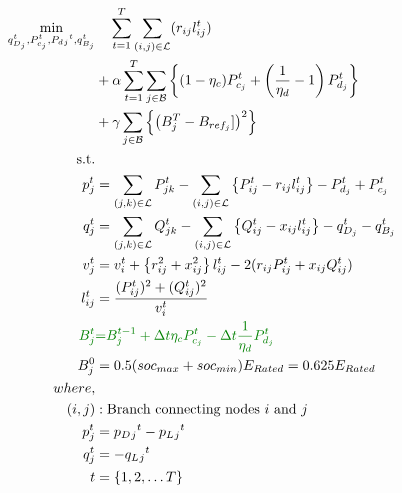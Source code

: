 \begin{gather}
	\begin{align}
		\min_{
		\substack{
		q_{D_j}^t, P_{c_j}^t, P_d{_j}^t, q_{B_j}^t}
		} 
		\vspace{-15ex} %
		& \quad
		\sum_{t = 1}^{T} \sum_{(i, j) \in \mathcal{L}} (r_{ij}l_{ij}^t) \\
		&+ \alpha \sum_{t = 1}^{T} \sum_{j \in \mathcal{B}} \left\{ (1- \eta_c)P_{c_j}^t + \left(\frac{1}{\eta_d}-1\right) P_{d_j}^t \right\} \\
		&+ \gamma \sum_{j \in \mathcal{B}} \left\{ \left(B^{T}_{j} - B_{ref_{j}}]\right)^2\right\} \\
		\text{s.t.} & {}\nonumber \\
		{p_j^t} & = {\sum_{(j, k) \in \mathcal{L}} P_{jk}^t - \sum_{(i, j) \in \mathcal{L}}\left\{P_{ij}^t - r_{ij}l_{ij}^t\right\} - P_{d_j}^t + P_{c_j}^t} && \\
		{q_j^t} & = {\sum_{(j, k) \in \mathcal{L}} Q_{jk}^t - \sum_{(i, j) \in \mathcal{L}}\left\{Q_{ij}^t - x_{ij}l_{ij}^t\right\} - q_{D_j}^t - q_{B_j}^t} && \\
		{v_j^t} & = {v_{i}^t +  \left\{r_{ij}^2 + x_{ij}^2\right\}l_{ij}^t - 2(r_{ij}P_{ij}^t + x_{ij}Q_{ij}^t)} && \\
		{l_{ij}^t} & = {\frac{(P_{ij}^{t})^2 + (Q_{ij}^{t})^2}{v_i^t}} \\
		{\color{darkgreen}{ B_{j}^{t} }} &\color{darkgreen}{=} { \color{darkgreen}{ B_{j}^{t-1} + \Delta t  \eta_c P_{c_j}^t - \Delta t\frac{1}{\eta_d} P_{d_j}^t } } \\
		{ B_{j}^{0} } &= { 0.5(soc_{max}+soc_{min})E_{Rated} = 0.625E_{Rated}} \\
		{where,} & {} \\
		{(i, j)} &: {\text{Branch connecting nodes $i$ and $j$}} \\
		{p_j^t} &= {p_D{_j}^t - p_L{_j}^t} \\
		{q_j^t} &= {-q_L{_j}^t} \\
		{t} &= {\{1, 2, \ldots T\}}
	\end{align}
\end{gather}

